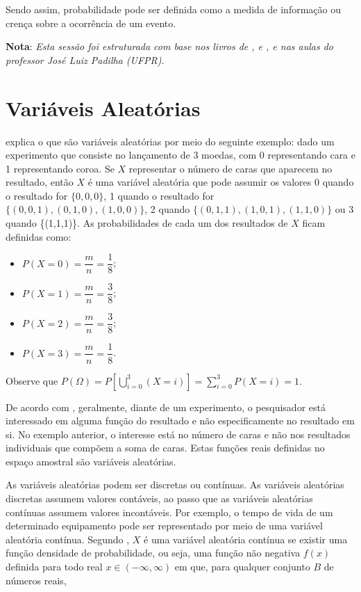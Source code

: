 Sendo assim, probabilidade pode ser definida como a medida de informação ou crença sobre a ocorrência de um evento.

\textbf{Nota}: \textit{Esta sessão foi estruturada com base nos livros de \textcite{Ross2010}, \textcite{Pinheiro2012} e \textcite{Favero2017}, e nas aulas do professor José Luiz Padilha (UFPR)}.

\section{Variáveis Aleatórias}

\textcite{Ross2010} explica o que são variáveis aleatórias por meio do seguinte exemplo: dado um experimento que consiste no lançamento de 3 moedas, com 0 representando cara e 1 representando coroa. Se $X$ representar o número de caras que aparecem no resultado, então $X$ é uma variável aleatória que pode assumir os valores 0 quando o resultado for $\{0,0,0\}$, 1 quando o resultado for $\{(0,0,1), (0,1,0), (1,0,0)\}$, 2 quando $\{(0,1,1), (1,0,1), (1,1,0)\}$ ou 3 quando \{(1,1,1)\}. As probabilidades de cada um dos resultados de $X$ ficam definidas como:

\begin{itemize}
    \item $P(X = 0) = \dfrac{m}{n} = \dfrac{1}{8}$;
    \item $P(X = 1) = \dfrac{m}{n} = \dfrac{3}{8}$;
    \item $P(X = 2) = \dfrac{m}{n} = \dfrac{3}{8}$;
    \item $P(X = 3) = \dfrac{m}{n} = \dfrac{1}{8}$.
\end{itemize} Observe que $P(\Omega) = P\left[ \bigcup\limits_{i=0}^3 (X = i)\right] = \sum\limits_{i=0}^3 P(X = i) = 1$.

De acordo com \textcite{Ross2010}, geralmente, diante de um experimento, o pesquisador está interessado em alguma função do resultado e não especificamente no resultado em si. No exemplo anterior, o interesse está no número de caras e não nos resultados individuais que compõem a soma de caras. Estas funções reais definidas no espaço amostral são variáveis aleatórias.

As variáveis aleatórias podem ser discretas ou contínuas. As variáveis aleatórias discretas assumem valores contáveis, ao passo que as variáveis aleatórias contínuas assumem valores incontáveis. Por exemplo, o tempo de vida de um determinado equipamento pode ser representado por meio de uma variável aleatória contínua. Segundo \textcite{Ross2010}, $X$ é uma variável aleatória contínua se existir uma função densidade de probabilidade, ou seja, uma função não negativa $f(x)$ definida para todo real $x \in (-\infty, \infty)$ em que, para qualquer conjunto $B$ de números reais,

